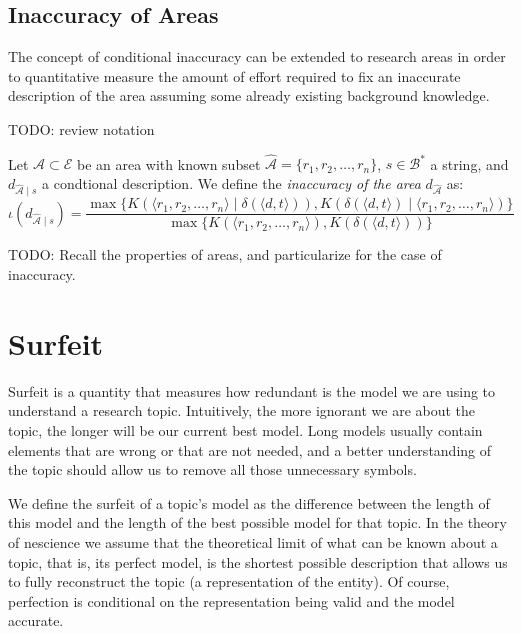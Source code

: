 %
%

\subsection{Inaccuracy of Areas}

The concept of conditional inaccuracy can be extended to research areas in order to quantitative measure the amount of effort required to fix an inaccurate description of the area assuming some already existing background knowledge.

{\color{red} TODO: review notation}

\begin{definition}
Let $\mathcal{A} \subset \mathcal{E}$ be an area with known subset $\hat{\mathcal{A}} = \{r_1, r_2, \ldots, r_n\}$, $s \in \mathcal{B}^\ast$ a string, and $d_{\hat{\mathcal{A}} \mid s}$ a condtional description. We define the \emph{inaccuracy of the area} $d_{\hat{\mathcal{A}}}$ as:
\[
\iota(d_{\hat{\mathcal{A}} \mid s}) = \frac{ \max\{ K \left( \langle r_1, r_2, \ldots, r_n \rangle \mid \delta(\langle d, t \rangle) \right), K \left( \delta(\langle d, t \rangle) \mid \langle r_1, r_2, \ldots, r_n \rangle \right) \} } { \max\{ K(\langle r_1, r_2, \ldots, r_n \rangle), K \left(\delta(\langle d, t \rangle) \right) \} }
\]
\end{definition}

{\color{red} TODO: Recall the properties of areas, and particularize for the case of inaccuracy.}

%
%
\section{Surfeit}

Surfeit is a quantity that measures how redundant is the model we are using to understand a research topic. Intuitively, the more ignorant we are about the topic, the longer will be our current best model. Long models usually contain elements that are wrong or that are not needed, and a better understanding of the topic should allow us to remove all those unnecessary symbols. 

We define the surfeit of a topic's model as the difference between the length of this model and the length of the best possible model for that topic. In the theory of nescience we assume that the theoretical limit of what can be known about a topic, that is, its perfect model, is the shortest possible description that allows us to fully reconstruct the topic (a representation of the entity). Of course, perfection is conditional on the representation being valid and the model accurate.

